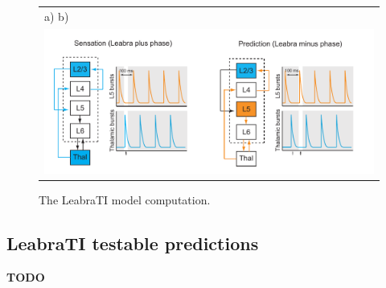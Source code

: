 \documentclass[dwyatte_dissertation.tex]{subfiles}
\begin{document}
\begin{figure}[h!]
\begin{center}
\begin{tabular}{ll}
a) \hspace{76mm} b) \\
\multicolumn{2}{c}{\includegraphics[width=160mm]{figs/chap_leabrati/leabrati_comp.pdf}} \\
\end{tabular}
\end{center}
\caption{The LeabraTI model computation.}
\label{fig:leabrati_comp}
\end{figure}

\subsection{LeabraTI testable predictions}
\textbf{TODO}
\end{document}
